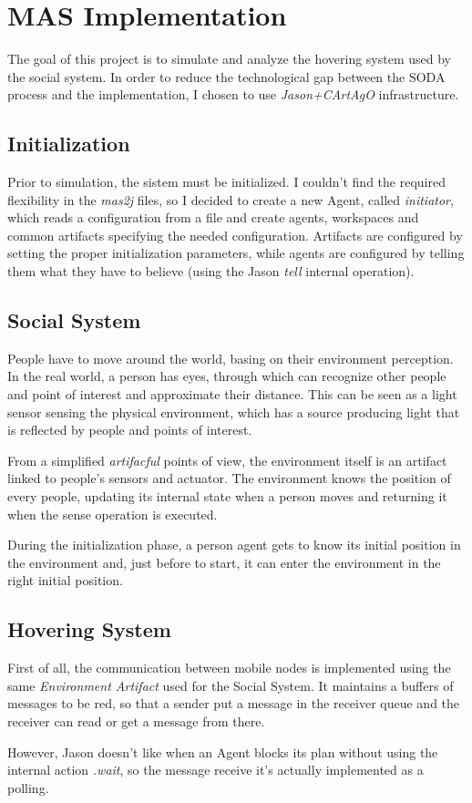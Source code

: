 \section{MAS Implementation}
\label{sec:implementation}

The goal of this project is to simulate and analyze the
hovering system used by the social system. In order to
reduce the technological gap between the SODA process and
the implementation, I chosen to use \emph{Jason+CArtAgO}
infrastructure.

\subsection{Initialization}
Prior to simulation, the sistem must be initialized. I couldn't find the
required flexibility in the \emph{mas2j} files, so I decided to create a new
Agent, called \emph{initiator}, which reads a configuration from a file and
create agents, workspaces and common artifacts specifying the needed configuration.
Artifacts are configured by setting the proper initialization parameters, while
agents are configured by telling them what they have to believe (using the
Jason \emph{tell} internal operation).

\subsection{Social System}
People have to move around the world, basing on
their environment perception. In the real world,
a person has eyes, through which can recognize other
people and point of interest and approximate their distance.
This can be seen as a light sensor sensing the
physical environment, which has a source producing light
that is reflected by people and points of interest.

From a simplified \emph{artifacful} points of view, the
environment itself is an artifact linked to people's
sensors and actuator. The environment knows the position of
every people, updating its internal state when a person moves
and returning it when the sense operation is executed.

During the initialization phase, a person agent gets to know
its initial position in the environment and, just before to start,
it can enter the environment in the right initial position.

\subsection{Hovering System}

First of all, the communication between mobile nodes is implemented using
the same \emph{Environment Artifact} used for the Social System. It
maintains a buffers of messages to be red, so that a sender put a message
in the receiver queue and the receiver can read or get a message from there.

However, Jason doesn't like when an Agent blocks its plan without using the
internal action \emph{.wait}, so the message receive it's actually implemented
as a polling.